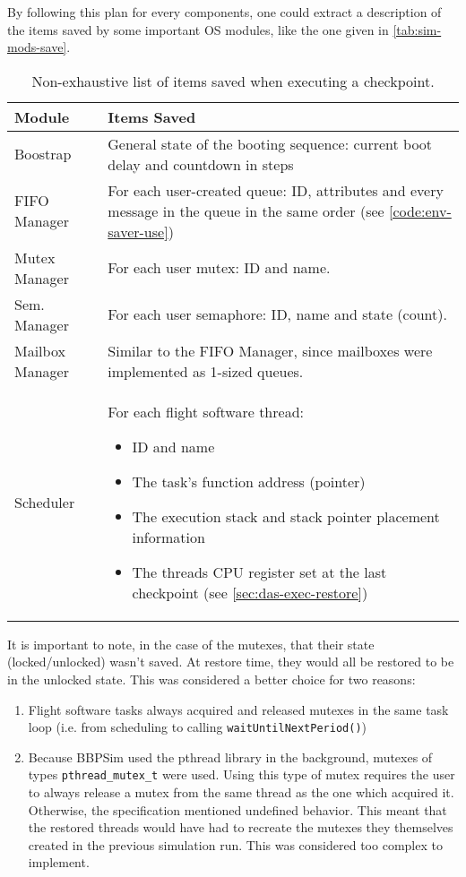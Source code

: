{By following this plan for every components, one could extract a description of the items saved by some important OS modules, like the one given in  \autoref{tab:sim-mods-save}. 

\begin{table}[htbp]
	\centering
	\begin{tabularx}{\linewidth}{l X}
		\toprule
		\textbf{Module} & \textbf{Items Saved}\\
		\midrule
		Boostrap & {General state of the booting sequence: current boot delay and countdown in steps}\\
		\midrule
		FIFO Manager & {For each user-created queue: ID, attributes and every message in the queue in the same order (see \autoref{code:env-saver-use})}\\
		\midrule
		Mutex Manager & {For each user mutex: ID and name.}\\
		\midrule
		Sem. Manager & {For each user semaphore: ID, name and state (count).}\\	
		\midrule
		Mailbox Manager & {Similar to the FIFO Manager, since mailboxes were implemented as 1-sized queues.}\\
		\midrule
		Scheduler & {For each flight software thread:
		\vspace{-6pt}
		\begin{itemize}\setlength\itemsep{0em}
			\item ID and name
			\item The task's function address (pointer)
			\item The execution stack and stack pointer placement information
			\item The threads CPU register set at the last checkpoint (see \autoref{sec:das-exec-restore})
		\end{itemize}	
		}\\
		\bottomrule
	\end{tabularx}
	\caption{Non-exhaustive list of items saved when executing a checkpoint.}
	\label{tab:sim-mods-save}
\end{table}

It is important to note, in the case of the mutexes, that their state (locked/unlocked) wasn't saved. At restore time, they would all be restored to be in the unlocked state. This was considered a better choice for two reasons: 
\begin{enumerate}
	\item Flight software tasks always acquired and released mutexes in the same task loop (i.e. from scheduling to calling \texttt{waitUntilNextPeriod()})
	\item Because \gls{BBPSim} used the pthread library in the background, mutexes of types \texttt{pthread_mutex_t} were used. Using this type of mutex requires the user to always release a mutex from the same thread as the one which acquired it. Otherwise, the specification mentioned undefined behavior\cite{online:pthread-mutex}. This meant that the restored threads would have had to recreate the mutexes they themselves created in the previous simulation run. This was considered too complex to implement.
\end{enumerate}

}
